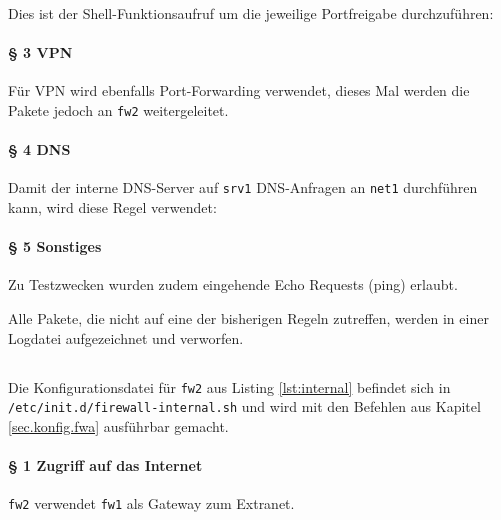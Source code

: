 
\noindent Dies ist der Shell-Funktionsaufruf um die jeweilige Portfreigabe
durchzuführen:


\paragraph{§ 3 VPN}

Für VPN wird ebenfalls Port-Forwarding verwendet, dieses Mal werden
die Pakete jedoch an {\tt fw2} weitergeleitet.


\paragraph{§ 4 DNS}

Damit der interne DNS-Server auf {\tt srv1} DNS-Anfragen an {\tt net1}
durch\-führen kann, wird diese Regel verwendet:


\paragraph{§ 5 Sonstiges}

Zu Testzwecken wurden zudem eingehende Echo Requests (ping) erlaubt.


\noindent Alle Pakete, die nicht auf eine der bisherigen Regeln zutreffen,
werden in einer Logdatei aufgezeichnet und verworfen.


\subsection{\fwb}

Die Konfigurationsdatei für {\tt fw2} aus Listing \ref{lst:internal}
befindet sich in\\
{\tt /etc/init.d/firewall-internal.sh} und wird mit den Befehlen
aus Kapitel \ref{sec.konfig.fwa} ausführbar gemacht.

\paragraph{§ 1 Zugriff auf das Internet}

{\tt fw2} verwendet {\tt fw1} als Gateway zum Extranet.


